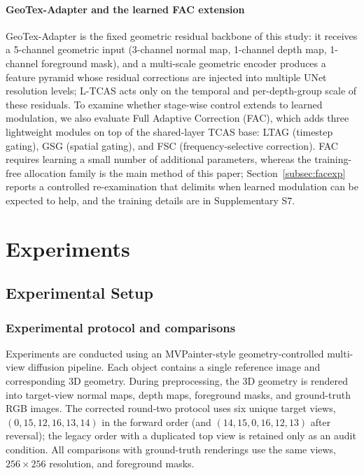 \documentclass[times,twocolumn,final]{elsarticle}
\begin{document}
\paragraph{GeoTex-Adapter and the learned FAC extension}
GeoTex-Adapter is the fixed geometric residual backbone of this study: it receives a 5-channel geometric input (3-channel normal map, 1-channel depth map, 1-channel foreground mask), and a multi-scale geometric encoder produces a feature pyramid whose residual corrections are injected into multiple UNet resolution levels; L-TCAS acts only on the temporal and per-depth-group scale of these residuals. To examine whether stage-wise control extends to learned modulation, we also evaluate Full Adaptive Correction (FAC), which adds three lightweight modules on top of the shared-layer TCAS base: LTAG (timestep gating), GSG (spatial gating), and FSC (frequency-selective correction). FAC requires learning a small number of additional parameters, whereas the training-free allocation family is the main method of this paper; Section~\ref{subsec:facexp} reports a controlled re-examination that delimits when learned modulation can be expected to help, and the training details are in Supplementary S7.

\section{Experiments}
\label{sec:experiments}

\subsection{Experimental Setup}
\label{subsec:setup}

\subsubsection{Experimental protocol and comparisons}

Experiments are conducted using an MVPainter-style geometry-controlled multi-view diffusion pipeline. Each object contains a single reference image and corresponding 3D geometry. During preprocessing, the 3D geometry is rendered into target-view normal maps, depth maps, foreground masks, and ground-truth RGB images. The corrected round-two protocol uses six unique target views, $(0,15,12,16,13,14)$ in the forward order (and $(14,15,0,16,12,13)$ after reversal); the legacy order with a duplicated top view is retained only as an audit condition. All comparisons with ground-truth renderings use the same views, $256\times256$ resolution, and foreground masks.
\end{document}
